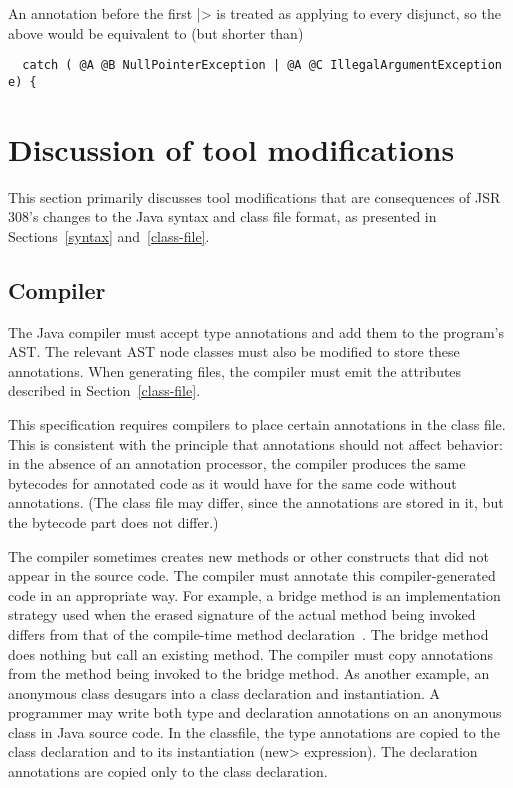 \documentclass[10pt]{article}
\begin{document}
An annotation before the first \<|> is treated as applying to every
disjunct, so the above would be equivalent to (but shorter than)

\begin{Verbatim}
  catch ( @A @B NullPointerException | @A @C IllegalArgumentException e) {
\end{Verbatim}


\section{Discussion of tool modifications\label{mods-discussion}}

This section primarily discusses tool modifications that are consequences
of JSR 308's changes to the Java syntax and class file format, as presented
in Sections~\ref{syntax} and~\ref{class-file}.


\subsection{Compiler\label{compiler-mods}}

The Java compiler must accept type annotations
and add them to the program's AST\@.  The relevant AST node
classes must also be modified to store these annotations.
When generating  files, the compiler must emit the attributes
described in Section~\ref{class-file}.

This specification requires compilers to place certain annotations
in the class file.  This is consistent with the principle that annotations
should not affect behavior:  in the absence of an annotation processor, the
compiler produces the same bytecodes for annotated code as it would have
for the same code without annotations.  (The class file may differ, since
the annotations are stored in it, but the bytecode part does not differ.)

The compiler sometimes creates new methods or other constructs
that did not appear in the
source code.  The compiler must annotate this compiler-generated code
in an appropriate way.  For example, a bridge method is an implementation
strategy used when the erased signature of the actual method being invoked
differs from that of the compile-time method
declaration~\cite[\S15.12.4.5]{GoslingJSB2005}.  The bridge method does
nothing but call an existing method.  The compiler must copy annotations
from the method being invoked to the bridge method.
As another example, an anonymous class desugars into a class declaration
and instantiation.  A programmer may write both type and declaration
annotations on an anonymous class in Java source code.  In the classfile,
the type annotations are copied to the class declaration and to its
instantiation (\<new> expression).  The declaration annotations are copied
only to the class declaration.
\end{document}
